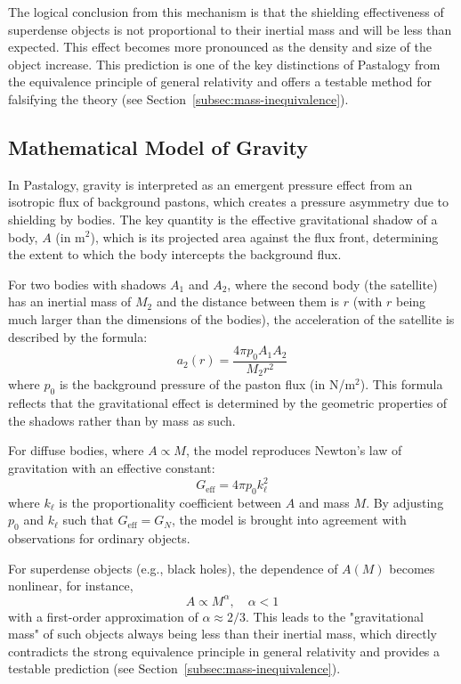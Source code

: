 \documentclass[pdflatex,sn-mathphys-num]{sn-jnl}
\begin{document}
The logical conclusion from this mechanism is that the shielding effectiveness of superdense objects is not proportional to their inertial mass and will be less than expected. This effect becomes more pronounced as the density and size of the object increase. This prediction is one of the key distinctions of Pastalogy from the equivalence principle of general relativity and offers a testable method for falsifying the theory (see Section~\ref{subsec:mass-inequivalence}).

\subsection{Mathematical Model of Gravity}\label{subsec:gravity-model}

In Pastalogy, gravity is interpreted as an emergent pressure effect from an isotropic flux of background pastons, which creates a pressure asymmetry due to shielding by bodies. The key quantity is the effective gravitational shadow of a body, \( A \) (in m\(^2\)), which is its projected area against the flux front, determining the extent to which the body intercepts the background flux.

For two bodies with shadows \( A_1 \) and \( A_2 \), where the second body (the satellite) has an inertial mass of \( M_2 \) and the distance between them is \( r \) (with \( r \) being much larger than the dimensions of the bodies), the acceleration of the satellite is described by the formula:
\[
a_2(r) = \frac{4\pi p_0 A_1 A_2}{M_2 r^2}
\]
where \( p_0 \) is the background pressure of the paston flux (in N/m\(^2\)). This formula reflects that the gravitational effect is determined by the geometric properties of the shadows rather than by mass as such.

For diffuse bodies, where \( A \propto M \), the model reproduces Newton's law of gravitation \cite{newton1687-principia, halliday2013-fundamentals} with an effective constant:
\[
G_{\text{eff}} = 4\pi p_0 k_\ell^2
\]
where \( k_\ell \) is the proportionality coefficient between \( A \) and mass \( M \). By adjusting \( p_0 \) and \( k_\ell \) such that \( G_{\text{eff}} = G_N \), the model is brought into agreement with observations for ordinary objects.

For superdense objects (e.g., black holes), the dependence of \( A(M) \) becomes nonlinear, for instance,
\[
A \propto M^\alpha, \quad \alpha < 1
\]
with a first-order approximation of \( \alpha \approx 2/3 \). This leads to the "gravitational mass" of such objects always being less than their inertial mass, which directly contradicts the strong equivalence principle in general relativity and provides a testable prediction (see Section~\ref{subsec:mass-inequivalence}).
\end{document}
